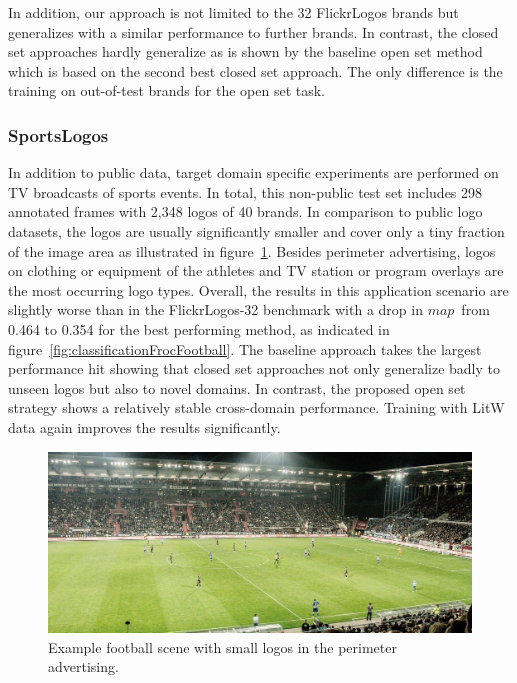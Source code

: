 \documentclass[a4paper,twoside]{article}
\newcommand{\map}{$\mathit{map}$}
\begin{document}
In addition, our approach is not limited to the 32 FlickrLogos brands but generalizes with a similar performance to further brands. In contrast, the closed set approaches hardly generalize as is shown by the baseline open set method which is based on the second best closed set approach. The only difference is the training on out-of-test brands for the open set task.

\subsubsection*{SportsLogos}
\vspace*{-2.5mm}
In addition to public data, target domain specific experiments are performed on TV broadcasts of sports events. In total, this non-public test set includes 298 annotated frames with 2,348 logos of 40 brands. In comparison to public logo datasets, the logos are usually significantly smaller and cover only a tiny fraction of the image area as illustrated in figure~\ref{fig:footballSample}. Besides perimeter advertising, logos on clothing or equipment of the athletes and TV station or program overlays are the most occurring logo types.
Overall, the results in this application scenario are slightly worse than in the FlickrLogos-32 benchmark with a drop in \map~from 0.464 to 0.354 for the best performing method, as indicated in figure~\ref{fig:classificationFrocFootball}. The baseline approach takes the largest performance hit showing that closed set approaches not only generalize badly to unseen logos but also to novel domains. In contrast, the proposed open set strategy shows a relatively stable cross-domain performance. Training with \ac{LitW} data again improves the results significantly.
%
\begin{figure}%
\centering%
\includegraphics[width=\linewidth, trim=0cm 0cm 0cm 0.5cm, clip]{img/football-1908719_1920_cut.jpg}%
\caption{Example football scene with small logos in the perimeter advertising.}%
\label{fig:footballSample}
\end{figure}%
\end{document}
